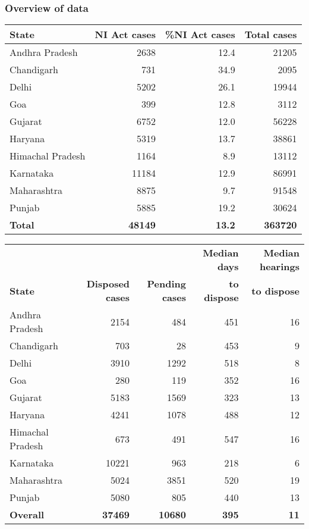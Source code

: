 \documentclass[10pt,aspectratio=169]{beamer}
\begin{document}
\begin{frame}[allowframebreaks]
  \frametitle{Overview of data}
\begin{longtable}{@{}lrrr@{}}
\toprule
\textbf{State} & \textbf{NI Act cases} & \textbf{\%NI Act cases} & \textbf{Total cases}\\ \midrule
\endhead
Andhra Pradesh & 2638 & 12.4 & 21205\\
Chandigarh & 731 & 34.9 & 2095\\
Delhi & 5202 & 26.1 & 19944\\
Goa & 399 & 12.8 & 3112\\
Gujarat & 6752 & 12.0 & 56228\\
Haryana & 5319 & 13.7 & 38861\\
Himachal Pradesh & 1164 & 8.9 & 13112\\
Karnataka & 11184 & 12.9 & 86991\\
Maharashtra & 8875 & 9.7 & 91548\\
Punjab & 5885 & 19.2 & 30624\\
\midrule
\textbf{Total} & \textbf{48149} & \textbf{13.2} & \textbf{363720}\\ \bottomrule
\end{longtable}

\framebreak
{\small \begin{longtable}{@{}lrrrr@{}}
\toprule
& & & \textbf{Median days} & \textbf{Median hearings} \\
\textbf{State} & \textbf{Disposed cases} & \textbf{Pending cases} & \textbf{to dispose} & \textbf{to dispose} \\
\midrule
Andhra Pradesh & 2154 & 484 & 451 & 16 \\
Chandigarh & 703 & 28 & 453 & 9 \\
Delhi & 3910 & 1292 & 518 & 8 \\
Goa & 280 & 119 & 352 & 16 \\
Gujarat & 5183 & 1569 & 323 & 13 \\
Haryana & 4241 & 1078 & 488 & 12 \\
Himachal Pradesh & 673 & 491 & 547 & 16 \\
Karnataka & 10221 & 963 & 218 & 6 \\
Maharashtra & 5024 & 3851 & 520 & 19 \\
Punjab & 5080 & 805 & 440 & 13 \\
\midrule
\textbf{Overall} & \textbf{37469} & \textbf{10680} & \textbf{395} & \textbf{11} \\
\bottomrule
\end{longtable}}
\end{frame}
\end{document}
